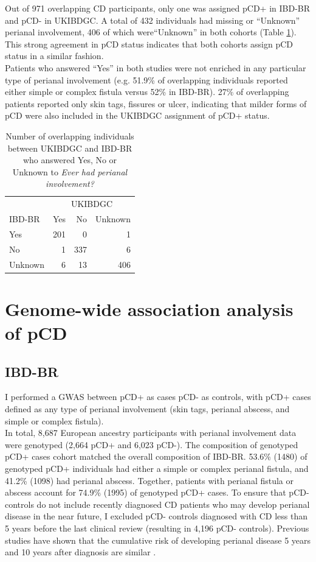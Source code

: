Out of 971 overlapping CD participants, only one was assigned pCD+ in IBD-BR and pCD- in UKIBDGC. A total of 432 individuals had missing or “Unknown” perianal involvement, 406 of which were“Unknown” in both cohorts (Table \ref{table:cohort_pcd_agree}). This strong agreement in pCD status indicates that both cohorts assign pCD status in a similar fashion.\\

Patients who answered “Yes'' in both studies were not enriched in any particular type of perianal involvement (e.g. 51.9\% of overlapping individuals reported either simple or complex fistula versus 52\% in IBD-BR). 27\% of overlapping patients reported only skin tags, fissures or ulcer, indicating that milder forms of pCD were also included in the UKIBDGC assignment of pCD+ status.


\begin{table}[htb]
  \caption{Number of overlapping individuals between UKIBDGC and IBD-BR who answered Yes, No or Unknown to \textit{Ever had perianal involvement?}}
  \label{table:cohort_pcd_agree}
  \centering
  \begin{tabular}[t]{|l|r|r|r|}
  \hline
  \multicolumn{1}{|c|}{ } & \multicolumn{3}{c|}{UKIBDGC} \\
  \cline{2-4}
  IBD-BR& Yes & No & Unknown\\
  \hline
  Yes & 201 & 0 & 1\\
  \hline
  No & 1 & 337 & 6\\
  \hline
  Unknown & 6 & 13 & 406\\
  \hline
  \end{tabular}
  \end{table}

  \section{Genome-wide association analysis of pCD}
\subsection{IBD-BR}
I performed a GWAS between pCD+ as cases pCD- as controls, with pCD+ cases defined as any type of perianal involvement (skin tags, perianal abscess, and simple or complex fistula).\\
 In total, 8,687 European ancestry participants with perianal involvement data were genotyped (2,664 pCD+ and 6,023 pCD-). The composition of genotyped pCD+ cases cohort matched the overall composition of IBD-BR. 53.6\% (1480) of genotyped pCD+ individuals had either a simple or complex perianal fistula, and 41.2\% (1098) had perianal abscess. Together, patients with perianal fistula or abscess account for 74.9\% (1995) of genotyped pCD+ cases. To ensure that pCD- controls do not include recently diagnosed CD patients who may develop perianal disease in the near future, I excluded pCD- controls diagnosed with CD less than 5 years before the last clinical review (resulting in 4,196 pCD- controls). Previous studies have shown that the cumulative risk of developing perianal disease 5 years and 10 years after diagnosis are similar \cite{Tsai2022-kz}.

